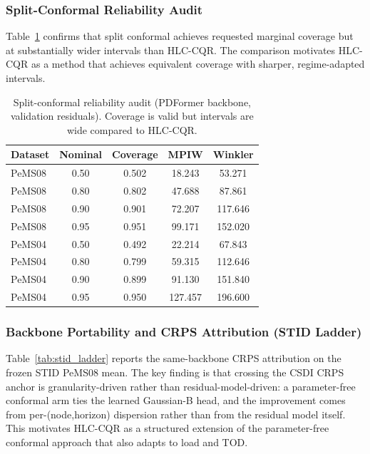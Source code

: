 \documentclass[letterpaper,journal]{IEEEtran}
\begin{document}
\subsubsection{Split-Conformal Reliability Audit}
Table~\ref{tab:conformal_multilevel} confirms that split conformal achieves
requested marginal coverage but at substantially wider intervals than
HLC-CQR.  The comparison motivates HLC-CQR as a method that achieves
equivalent coverage with sharper, regime-adapted intervals.

\begin{table}[t]
\centering
\caption{Split-conformal reliability audit (PDFormer backbone, validation
residuals).  Coverage is valid but intervals are wide compared to HLC-CQR.}
\label{tab:conformal_multilevel}
\footnotesize
\begin{tabular}{lcccc}
\toprule
Dataset & Nominal & Coverage & MPIW & Winkler \\
\midrule
PeMS08 & 0.50 & 0.502 & 18.243 & 53.271 \\
PeMS08 & 0.80 & 0.802 & 47.688 & 87.861 \\
PeMS08 & 0.90 & 0.901 & 72.207 & 117.646 \\
PeMS08 & 0.95 & 0.951 & 99.171 & 152.020 \\
PeMS04 & 0.50 & 0.492 & 22.214 & 67.843 \\
PeMS04 & 0.80 & 0.799 & 59.315 & 112.646 \\
PeMS04 & 0.90 & 0.899 & 91.130 & 151.840 \\
PeMS04 & 0.95 & 0.950 & 127.457 & 196.600 \\
\bottomrule
\end{tabular}
\end{table}

\subsubsection{Backbone Portability and CRPS Attribution (STID Ladder)}
Table~\ref{tab:stid_ladder} reports the same-backbone CRPS attribution on
the frozen STID PeMS08 mean.  The key finding is that crossing the CSDI
CRPS anchor is granularity-driven rather than residual-model-driven: a
parameter-free conformal arm ties the learned Gaussian-B head, and the
improvement comes from per-(node,horizon) dispersion rather than from the
residual model itself.  This motivates HLC-CQR as a structured extension
of the parameter-free conformal approach that also adapts to load and TOD.
\end{document}
